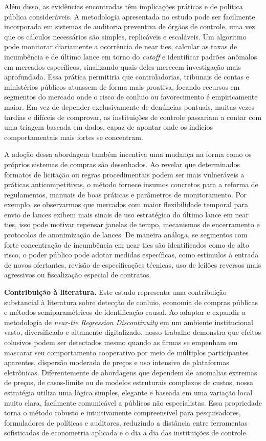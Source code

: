 \documentclass[12pt,a4paper]{article}
\begin{document}
Além disso, as evidências encontradas têm implicações práticas e de política pública consideráveis. A metodologia apresentada no estudo pode ser facilmente incorporada em sistemas de auditoria preventiva de órgãos de controle, uma vez que os cálculos necessários são simples, replicáveis e escaláveis. Um algoritmo pode monitorar diariamente a ocorrência de near ties, calcular as taxas de incumbência e de último lance em torno do \textit{cutoff} e identificar padrões anômalos em mercados específicos, sinalizando quais deles merecem investigação mais aprofundada. Essa prática permitiria que controladorias, tribunais de contas e ministérios públicos atuassem de forma mais proativa, focando recursos em segmentos do mercado onde o risco de conluio ou favorecimento é empiricamente maior. Em vez de depender exclusivamente de denúncias pontuais, muitas vezes tardias e difíceis de comprovar, as instituições de controle passariam a contar com uma triagem baseada em dados, capaz de apontar onde os indícios comportamentais mais fortes se concentram.

A adoção dessa abordagem também incentiva uma mudança na forma como os próprios sistemas de compras são desenhados. Ao revelar que determinados formatos de licitação ou regras procedimentais podem ser mais vulneráveis a práticas anticompetitivas, o método fornece insumos concretos para a reforma de regulamentos, manuais de boas práticas e parâmetros de monitoramento. Por exemplo, se observarmos que mercados com maior flexibilidade temporal para envio de lances exibem mais sinais de uso estratégico do último lance em near ties, isso pode motivar repensar janelas de tempo, mecanismos de encerramento e protocolos de anonimização de lances. De maneira análoga, se segmentos com forte concentração de incumbência em near ties são identificados como de alto risco, o poder público pode adotar medidas específicas, como estímulos à entrada de novos ofertantes, revisão de especificações técnicas, uso de leilões reversos mais agressivos ou fiscalização especial de contratos.

\bigskip
\textbf{Contribuição à literatura.} Este estudo representa uma contribuição substancial à literatura sobre detecção de conluio, economia de compras públicas e métodos semiparamétricos de identificação causal. Ao adaptar e expandir a metodologia de \textit{near-tie Regression Discontinuity} em um ambiente institucional vasto, diversificado e altamente digitalizado, nosso trabalho demonstra que efeitos colusivos podem ser detectados mesmo quando as firmas se empenham em mascarar seu comportamento cooperativo por meio de múltiplos participantes aparentes, dispersão moderada de preços e uso intensivo de plataformas eletrônicas. Diferentemente de abordagens que dependem de anomalias extremas de preços, de casos-limite ou de modelos estruturais complexos de custos, nossa estratégia utiliza uma lógica simples, elegante e baseada em uma variação local muito clara, facilmente comunicável a públicos não especialistas. Essa propriedade torna o método robusto e intuitivamente compreensível para pesquisadores, formuladores de políticas e auditores, reduzindo a distância entre ferramentas sofisticadas de econometria aplicada e o dia a dia das instituições de controle.
\end{document}
